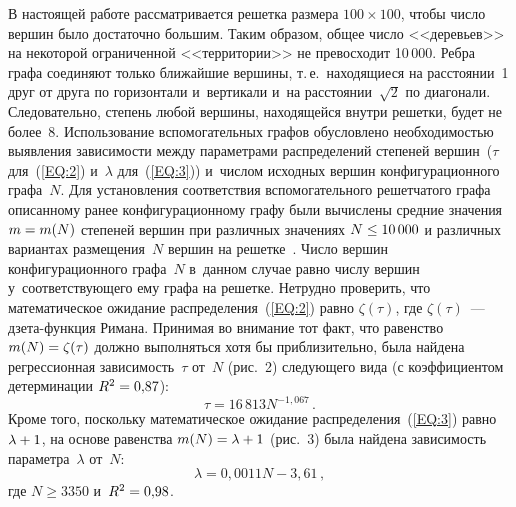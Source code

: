 \begin{multicols}{2}
В настоящей работе рассматривается решетка размера $100\times 100$,
чтобы чис\-ло вершин было достаточно большим. Таким образом, общее чис\-ло
<<деревьев>> на некоторой ограниченной <<территории>> не превосходит
10\,000.
Ребра графа соединяют только ближайшие вершины, т.\,е.\ находящиеся на
расстоянии~1 друг от друга по горизонтали и~вертикали и~на расстоянии~$\sqrt{2}$
по диагонали.
Следовательно, степень любой вершины, находящейся внутри решетки, будет не более~8.
Использование вспомогательных графов обусловлено не\-об\-хо\-ди\-мостью выявления
зависимости между па\-ра\-мет\-ра\-ми распределений степеней вершин~($\tau$ для~(\ref{EQ:2})
и~$\lambda$ для~(\ref{EQ:3})) и~чис\-лом исходных вершин конфигурационного графа~$N$.
Для установления соответствия вспомогательного решетчатого графа описанному ранее
конфигурационному графу были вы\-чис\-ле\-ны средние значения $m\hm=m(N)$ степеней вершин при
различных значениях $N\hm\leq 10\,000$ и различных вариантах размещения~$N$ вершин на
решетке~\cite{Ler3}. Число вершин конфигурационного графа~$N$ в~данном случае равно
чис\-лу вершин у~соответствующего ему графа на решетке. Нетрудно проверить,
что математическое
ожидание распределения~(\ref{EQ:2}) равно $\zeta(\tau)$, где $\zeta(\tau)$~---
дзе\-та-функ\-ция
Римана. Принимая во внимание тот факт, что равенство $m(N)\hm=\zeta(\tau)$ должно выполняться
хотя бы приблизительно, была найдена регрессионная зависимость~$\tau$ от~$N$
(рис.~2) следующего вида (с коэффициентом детерминации $R^2\hm=0{,}87$):
\begin{equation}
\label{EQ:4}
\tau = 16\,813N^{-1{,}067}\,.
\end{equation}
Кроме того, поскольку математическое ожидание распределения~(\ref{EQ:3})
равно $\lambda \hm+1$, на основе равенства $m(N)\hm=\lambda \hm+1$ (рис.~3)
была найдена зависимость параметра~$\lambda$ от~$N$:
\begin{equation}
\label{EQ:5}
\lambda = 0{,}0011N-3{,}61\,,
\end{equation}
где $N\geqslant 3350$ и~$R^2\hm=0{,}98$.



\end{multicols}
